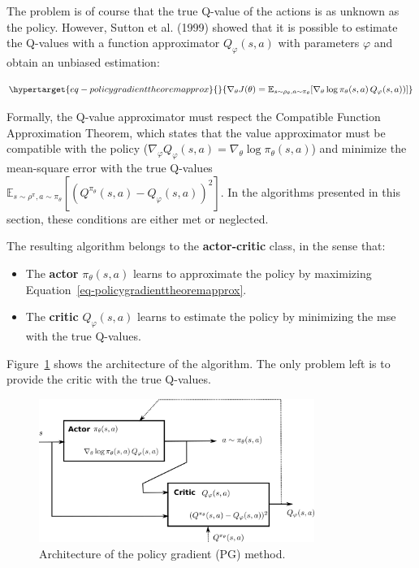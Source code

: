 \documentclass[
  letterpaper,
  DIV=11,
  numbers=noendperiod]{scrreprt}
\providecommand{\tightlist}{%
  \setlength{\itemsep}{0pt}\setlength{\parskip}{0pt}}\usepackage{longtable,booktabs,array}
\begin{document}
The problem is of course that the true Q-value of the actions is as
unknown as the policy. However, Sutton et al. (1999) showed that it is
possible to estimate the Q-values with a function approximator
\(Q_\varphi(s, a)\) with parameters \(\varphi\) and obtain an unbiased
estimation:

\begin{equation}\protect\hypertarget{eq-policygradienttheoremapprox}{}{
    \nabla_\theta J(\theta) =  \mathbb{E}_{s \sim \rho_\theta, a \sim \pi_\theta}[\nabla_\theta \log \pi_\theta(s, a) \, Q_\varphi(s, a))]
}\label{eq-policygradienttheoremapprox}\end{equation}

Formally, the Q-value approximator must respect the Compatible Function
Approximation Theorem, which states that the value approximator must be
compatible with the policy
(\(\nabla_\varphi Q_\varphi(s, a) = \nabla_\theta \log \pi_\theta(s, a)\))
and minimize the mean-square error with the true Q-values
\(\mathbb{E}_{s \sim \rho^\pi, a \sim \pi_\theta} [(Q^{\pi_\theta}(s, a) - Q_\varphi(s, a))^2]\).
In the algorithms presented in this section, these conditions are either
met or neglected.

The resulting algorithm belongs to the \textbf{actor-critic} class, in
the sense that:

\begin{itemize}
\tightlist
\item
  The \textbf{actor} \(\pi_\theta(s, a)\) learns to approximate the
  policy by maximizing Equation~\ref{eq-policygradienttheoremapprox}.
\item
  The \textbf{critic} \(Q_\varphi(s, a)\) learns to estimate the policy
  by minimizing the mse with the true Q-values.
\end{itemize}

Figure~\ref{fig-actorcriticpolicy} shows the architecture of the
algorithm. The only problem left is to provide the critic with the true
Q-values.

\begin{figure}

{\centering \includegraphics[width=0.8\textwidth,height=\textheight]{./img/policygradient.png}

}

\caption{\label{fig-actorcriticpolicy}Architecture of the policy
gradient (PG) method.}

\end{figure}
\end{document}

